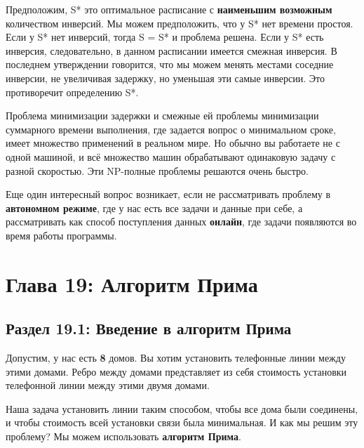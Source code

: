 \vspace{\baselineskip}
Предположим, S* это оптимальное расписание с \textbf{наименьшим возможным} количеством инверсий. Мы можем предположить, что у S* нет времени простоя. Если у S* нет инверсий, тогда S = S* и проблема решена. Если у S* есть инверсия, следовательно, в данном расписании имеется смежная инверсия. В последнем утверждении говорится, что мы можем менять местами соседние инверсии, не увеличивая задержку, но уменьшая эти самые инверсии. Это противоречит определению S*.

\vspace{\baselineskip}
Проблема минимизации задержки и смежные ей проблемы минимизации суммарного времени выполнения, где задается вопрос о минимальном сроке, имеет множество применений в реальном мире. Но обычно вы работаете не с одной машиной, и всё множество машин обрабатывают одинаковую задачу с разной скоростью. Эти NP-полные проблемы решаются очень быстро.

\vspace{\baselineskip}
Еще один интересный вопрос возникает, если не рассматривать проблему в \textbf{автономном режиме}, где у нас есть все задачи и данные при себе, а рассматривать как способ поступления данных \textbf{онлайн}, где задачи появляются во время работы программы.

\chapter*{Глава 19: Алгоритм Прима}

\vspace{\baselineskip}
\section*{Раздел 19.1: Введение в алгоритм Прима}

\vspace{\baselineskip}
Допустим, у нас есть \textbf{8} домов. Вы хотим установить телефонные линии между этими домами. Ребро между домами представляет из себя стоимость установки телефонной линии между этими двумя домами.


\vspace{\baselineskip}
Наша задача установить линии таким способом, чтобы все дома были соединены, и чтобы стоимость всей установки связи была минимальная. И как мы решим эту проблему? Мы можем использовать \textbf{алгоритм Прима}.

